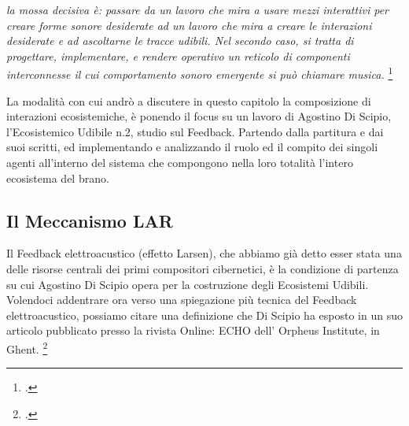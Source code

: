\begin{center}
\vspace{0.5cm}
\textit{la mossa decisiva è: passare da un lavoro che mira a usare mezzi interattivi per creare forme sonore desiderate ad
un lavoro che mira a creare le interazioni desiderate e ad ascoltarne le tracce udibili. Nel secondo caso, si tratta
di progettare, implementare, e rendere operativo un reticolo di componenti interconnesse il cui comportamento
sonoro emergente si può chiamare musica.} \footcite{discipio_polverisonore_2016}
\vspace{0.5cm}
\end{center}

La modalità con cui andrò a discutere in questo capitolo la composizione di interazioni ecosistemiche, 
è ponendo il focus su un lavoro di Agostino Di Scipio, l’Ecosistemico Udibile n.2, studio sul Feedback. 
Partendo dalla partitura e dai suoi scritti, ed implementando e analizzando
il ruolo ed il compito dei singoli agenti all'interno del sistema 
che compongono nella loro totalità l'intero ecosistema del brano. 

\subsection{Il Meccanismo LAR}
\label{sec:Il Meccanismo LAR}
Il Feedback elettroacustico (effetto Larsen), che abbiamo già detto
esser stata una delle risorse centrali dei primi compositori cibernetici,
è la condizione di partenza su cui Agostino Di Scipio opera per la costruzione degli Ecosistemi Udibili.
Volendoci addentrare ora verso una spiegazione più tecnica del Feedback elettroacustico,
possiamo citare una definizione che Di Scipio ha esposto in un suo articolo
pubblicato presso la rivista Online: ECHO dell’ Orpheus Institute, in
Ghent. \footcite{di_scipio_relational_2022}

